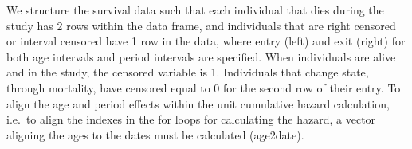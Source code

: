 \documentclass[11pt,]{article}
\newenvironment{Shaded}{\begin{snugshade}}{\end{snugshade}}
\newcommand{\KeywordTok}[1]{\textcolor[rgb]{0.13,0.29,0.53}{\textbf{#1}}}
\newcommand{\DecValTok}[1]{\textcolor[rgb]{0.00,0.00,0.81}{#1}}
\newcommand{\StringTok}[1]{\textcolor[rgb]{0.31,0.60,0.02}{#1}}
\newcommand{\CommentTok}[1]{\textcolor[rgb]{0.56,0.35,0.01}{\textit{#1}}}
\newcommand{\ControlFlowTok}[1]{\textcolor[rgb]{0.13,0.29,0.53}{\textbf{#1}}}
\newcommand{\OperatorTok}[1]{\textcolor[rgb]{0.81,0.36,0.00}{\textbf{#1}}}
\newcommand{\NormalTok}[1]{#1}
\begin{document}
\begin{Shaded}
\end{Shaded}

We structure the survival data such that each individual that dies
during the study has 2 rows within the data frame, and individuals that
are right censored or interval censored have 1 row in the data, where
entry (left) and exit (right) for both age intervals and period
intervals are specified. When individuals are alive and in the study,
the censored variable is 1. Individuals that change state, through
mortality, have censored equal to 0 for the second row of their entry.
To align the age and period effects within the unit cumulative hazard
calculation, i.e.~to align the indexes in the for loops for calculating
the hazard, a vector aligning the ages to the dates must be calculated
(age2date).
\end{document}
